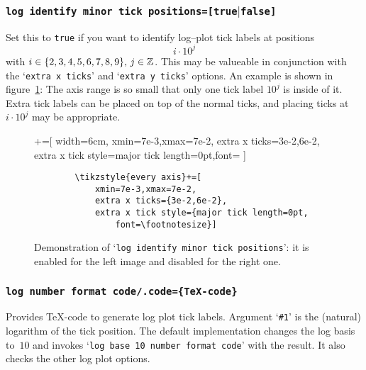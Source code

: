 \subsubsection[\texttt{log identify minor tick positions}]{\texttt{log identify minor tick positions=[true$|$false]}}
\label{sec:identify:minor:log}%
Set this to \texttt{true} if you want to identify log--plot tick labels at positions 
\[ i \cdot 10^j \]
with $i \in \{2,3,4,5,6,7,8,9\},\, j \in \mathbb{Z}$. This may be valueable in conjunction with the `\texttt{extra x ticks}' and `\texttt{extra y ticks}' options. An example is shown in figure~\ref{fig:identify:minor:log}: The axis range is so small that only one tick label $10^j$ is inside of it. Extra tick labels can be placed on top of the normal ticks, and placing ticks at $i \cdot 10^j $ may be appropriate.
\begin{figure}
	\centering
	+=[%
		width=6cm,
		xmin=7e-3,xmax=7e-2,
		extra x ticks={3e-2,6e-2},
		extra x tick style={major tick length=0pt,font=\footnotesize}
	]%
	\hspace{0.2cm}

	\begin{lstlisting}
		\tikzstyle{every axis}+=[
			xmin=7e-3,xmax=7e-2,
			extra x ticks={3e-2,6e-2},
			extra x tick style={major tick length=0pt,
				font=\footnotesize}]
	\end{lstlisting}
	\caption{Demonstration of `\texttt{log identify minor tick positions}': it is enabled for the left image and disabled for the right one.}
	\label{fig:identify:minor:log}
\end{figure}

\subsubsection[\texttt{log number format code/.code=\{\}}]{\texttt{log number format code/.code=\{\TeX-code\}}}
Provides \TeX-code to generate log plot tick labels. Argument `\texttt{\#1}' is the (natural) logarithm of the tick position.
The default implementation changes the log basis to~$10$ and invokes `\texttt{log base 10 number format code}' with the result. It also checks the other log plot options.


